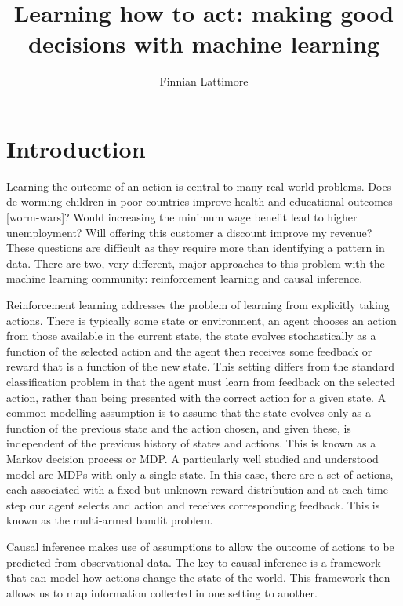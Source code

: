 \documentclass[11pt,a4paper]{article}
\author{Finnian Lattimore}
\title{Learning how to act: making good decisions with machine learning}
\begin{document}
\def\ci{\perp\!\!\!\perp} %
\newtheorem{theorem}{Theorem}[section]
\newtheorem{definition}{Definition}[section]
\maketitle

\section{Introduction}

Learning the outcome of an action is central to many real world problems. Does de-worming children in poor countries improve health and educational outcomes [worm-wars]? Would increasing the minimum wage benefit lead to higher unemployment? Will offering this customer a discount improve my revenue? These questions are difficult as they require more than identifying a pattern in data.  There are two, very different, major approaches to this problem with the machine learning community: reinforcement learning and causal inference. 

Reinforcement learning addresses the problem of learning from explicitly taking actions. There is typically some state or environment, an agent chooses an action from those available in the current state, the state evolves stochastically as a function of the selected action and the agent then receives some feedback or reward that is a function of the new state. This setting differs from the standard classification problem in that the agent must learn from feedback on the selected action, rather than being presented with the correct action for a given state. A common modelling assumption is to assume that the state evolves only as a function of the previous state and the action chosen, and given these, is independent of the previous history of states and actions. This is known as a Markov decision process or MDP.  A particularly well studied and understood model are MDPs with only a single state. In this case, there are a set of actions, each associated with a fixed but unknown reward distribution and at each time step our agent selects and action and receives corresponding feedback. This is known as the multi-armed bandit problem. 

Causal inference makes use of assumptions to allow the outcome of actions to be predicted from observational data. The key to causal inference is a framework that can model how actions change the state of the world. This framework then allows us to map information collected in one setting to another. 
\end{document}
